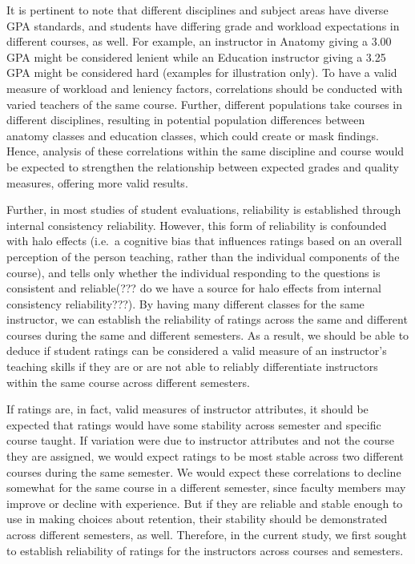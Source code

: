 \documentclass[man]{apa6}
\theoremstyle{definition}
\theoremstyle{definition}
\theoremstyle{definition}
\theoremstyle{remark}
\begin{document}
It is pertinent to note that different disciplines and subject areas
have diverse GPA standards, and students have differing grade and
workload expectations in different courses, as well. For example, an
instructor in Anatomy giving a 3.00 GPA might be considered lenient
while an Education instructor giving a 3.25 GPA might be considered hard
(examples for illustration only). To have a valid measure of workload
and leniency factors, correlations should be conducted with varied
teachers of the same course. Further, different populations take courses
in different disciplines, resulting in potential population differences
between anatomy classes and education classes, which could create or
mask findings. Hence, analysis of these correlations within the same
discipline and course would be expected to strengthen the relationship
between expected grades and quality measures, offering more valid
results.

Further, in most studies of student evaluations, reliability is
established through internal consistency reliability. However, this form
of reliability is confounded with halo effects (i.e.~a cognitive bias
that influences ratings based on an overall perception of the person
teaching, rather than the individual components of the course), and
tells only whether the individual responding to the questions is
consistent and reliable(??? do we have a source for halo effects from
internal consistency reliability???). By having many different classes
for the same instructor, we can establish the reliability of ratings
across the same and different courses during the same and different
semesters. As a result, we should be able to deduce if student ratings
can be considered a valid measure of an instructor's teaching skills if
they are or are not able to reliably differentiate instructors within
the same course across different semesters.

If ratings are, in fact, valid measures of instructor attributes, it
should be expected that ratings would have some stability across
semester and specific course taught. If variation were due to instructor
attributes and not the course they are assigned, we would expect ratings
to be most stable across two different courses during the same semester.
We would expect these correlations to decline somewhat for the same
course in a different semester, since faculty members may improve or
decline with experience. But if they are reliable and stable enough to
use in making choices about retention, their stability should be
demonstrated across different semesters, as well. Therefore, in the
current study, we first sought to establish reliability of ratings for
the instructors across courses and semesters.
\end{document}
